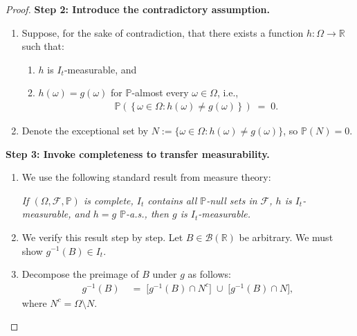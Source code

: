 \documentclass[12pt,openany]{book}
\newcommand{\calI}{\mathcal{I}}
\numberwithin{equation}{chapter}
\theoremstyle{plain}
\theoremstyle{definition}
\theoremstyle{remark}
\numberwithin{equation}{chapter}
\theoremstyle{plain}
\def\calI{I}%
\begin{document}
\begin{proof}
\medskip
\noindent\textbf{Step 2: Introduce the contradictory assumption.}
\begin{enumerate}
  \item Suppose, for the sake of contradiction, that there exists
        a function $h : \Omega \to \mathbb{R}$ such that:
        \begin{enumerate}
          \item[(a)] $h$ is $\calI_t$-measurable, and
          \item[(b)] $h(\omega) = g(\omega)$ for
                $\mathbb{P}$-almost every $\omega \in \Omega$,
                i.e.,
                \begin{align}
                  \mathbb{P}\!\left(\,
                    \{\,\omega \in \Omega :
                    h(\omega) \neq g(\omega)\,\}
                  \,\right)
                  \;=\; 0.
                \end{align}
        \end{enumerate}
  \item Denote the exceptional set by
        $N := \{\omega \in \Omega : h(\omega) \neq g(\omega)\}$,
        so $\mathbb{P}(N) = 0$.
\end{enumerate}

\medskip
\noindent\textbf{Step 3: Invoke completeness to transfer
measurability.}
\begin{enumerate}
  \item We use the following standard result from measure theory:

        \emph{If $(\Omega, \mathcal{F}, \mathbb{P})$ is complete,
        $\calI_t$ contains all $\mathbb{P}$-null sets in
        $\mathcal{F}$, $h$ is $\calI_t$-measurable, and
        $h = g$ $\mathbb{P}$-a.s., then $g$ is
        $\calI_t$-measurable.}

  \item We verify this result step by step.  Let
        $B \in \mathcal{B}(\mathbb{R})$ be arbitrary.  We must
        show $g^{-1}(B) \in \calI_t$.

  \item Decompose the preimage of $B$ under $g$ as follows:
        \begin{align}
          g^{-1}(B)
          &\;=\;
          \bigl[g^{-1}(B) \cap N^c\bigr]
          \;\cup\;
          \bigl[g^{-1}(B) \cap N\bigr],
        \end{align}
        where $N^c = \Omega \setminus N$.


\end{enumerate}
\end{proof}
\end{document}
